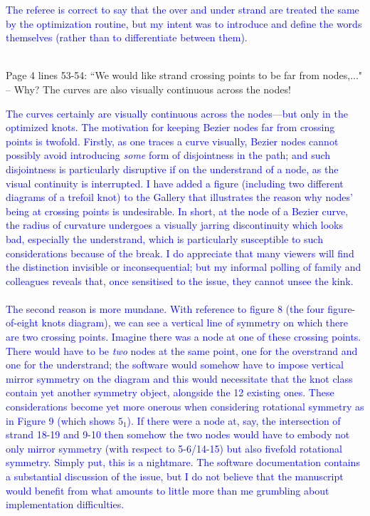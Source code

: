 \documentclass[12pt]{article}
\begin{document}
\textcolor{blue}{The referee is correct to say that the over and under
  strand are treated the same by the optimization routine, but my
  intent was to introduce and define the words themselves (rather than
  to differentiate between them).\\ \\}

Page 4 lines 53-54: ``We would like strand crossing points to be far
from nodes,..."  -- Why?  The curves are also visually continuous across
the nodes!

\textcolor{blue}{The curves certainly are visually continuous across
  the nodes---but only in the optimized knots.  The motivation for
  keeping Bezier nodes far from crossing points is twofold.  Firstly,
  as one traces a curve visually, Bezier nodes cannot possibly avoid
  introducing {\em some} form of disjointness in the path; and such
  disjointness is particularly disruptive if on the understrand of a
  node, as the visual continuity is interrupted.  I have added a
  figure (including two different diagrams of a trefoil knot) to the
  Gallery that illustrates the reason why nodes' being at crossing
  points is undesirable.  In short, at the node of a Bezier curve, the
  radius of curvature undergoes a visually jarring discontinuity which
  looks bad, especially the understrand, which is particularly
  susceptible to such considerations because of the break.  I do
  appreciate that many viewers will find the distinction invisible or
  inconsequential; but my informal polling of family and colleagues
  reveals that, once sensitised to the issue, they cannot unsee the
  kink.  \\ \\ The second reason is more mundane.  With reference to
  figure 8 (the four figure-of-eight knots diagram), we can see a
  vertical line of symmetry on which there are two crossing points.
  Imagine there was a node at one of these crossing points.  There
  would have to be {\em two} nodes at the same point, one for the
  overstrand and one for the understrand; the software would somehow
  have to impose vertical mirror symmetry on the diagram and this
  would necessitate that the knot class contain yet another symmetry
  object, alongside the 12 existing ones.  These considerations become
  yet more onerous when considering rotational symmetry as in Figure 9
  (which shows $5_1$).  If there were a node at, say, the intersection
  of strand 18-19 and 9-10 then somehow the two nodes would have to
  embody not only mirror symmetry (with respect to 5-6/14-15) but also
  fivefold rotational symmetry.  Simply put, this is a nightmare.  The
  software documentation contains a substantial discussion of the
  issue, but I do not believe that the manuscript would benefit from
  what amounts to little more than me grumbling about implementation
  difficulties.\\ \\}
\end{document}
